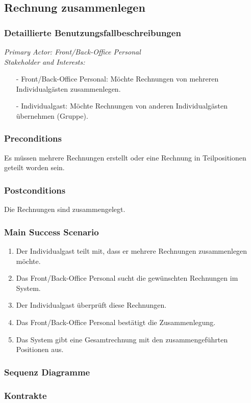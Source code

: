 \documentclass[./detailed_overview_usecases.tex]{subfiles}
\begin{document}
    \subsection{Rechnung zusammenlegen}
    \subsubsection{Detaillierte Benutzungsfallbeschreibungen}
    \textit{Primary Actor: Front/Back-Office Personal}
    \\
    \textit{Stakeholder and Interests:}
    \begin{itemize}
        \item[-] Front/Back-Office Personal: Möchte Rechnungen von mehreren Individualgästen zusammenlegen.
        \item[-] Individualgast: Möchte Rechnungen von anderen Individualgästen übernehmen (Gruppe).
    \end{itemize}

    \subsubsection*{Preconditions}
    Es müssen mehrere Rechnungen erstellt oder eine Rechnung in Teilpositionen geteilt worden sein.

    \subsubsection*{Postconditions}
    Die Rechnungen sind zusammengelegt.

    \subsubsection*{Main Success Scenario}
    \begin{enumerate}
        \item Der Individualgast teilt mit, dass er mehrere Rechnungen zusammenlegen möchte.
        \item Das Front/Back-Office Personal sucht die gewünschten Rechnungen im System.
        \item Der Individualgast überprüft diese Rechnungen.
        \item Das Front/Back-Office Personal bestätigt die Zusammenlegung.
        \item Das System gibt eine Gesamtrechnung mit den zusammengeführten Positionen aus.
    \end{enumerate}
    \subsubsection{Sequenz Diagramme}
    \subsubsection{Kontrakte}
\end{document}
